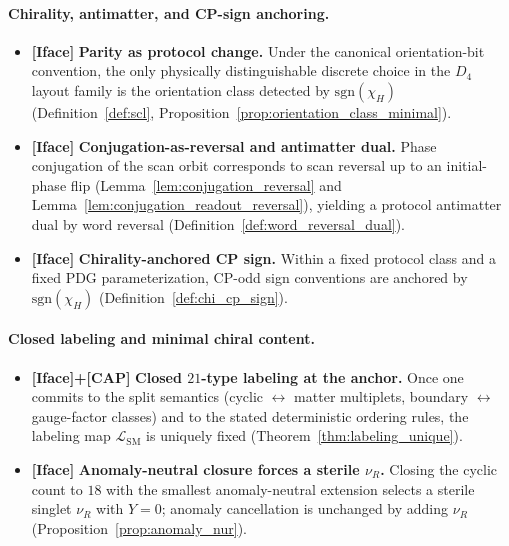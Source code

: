 \paragraph{Chirality, antimatter, and CP-sign anchoring.}
\begin{itemize}
\item \textbf{[Iface]} \textbf{Parity as protocol change.}
Under the canonical orientation-bit convention, the only physically distinguishable discrete choice in the $D_4$ layout family is the orientation class detected by $\mathrm{sgn}(\chi_H)$ (Definition~\ref{def:scl}, Proposition~\ref{prop:orientation_class_minimal}).
\item \textbf{[Iface]} \textbf{Conjugation-as-reversal and antimatter dual.}
Phase conjugation of the scan orbit corresponds to scan reversal up to an initial-phase flip (Lemma~\ref{lem:conjugation_reversal} and Lemma~\ref{lem:conjugation_readout_reversal}), yielding a protocol antimatter dual by word reversal (Definition~\ref{def:word_reversal_dual}).
\item \textbf{[Iface]} \textbf{Chirality-anchored CP sign.}
Within a fixed protocol class and a fixed PDG parameterization, CP-odd sign conventions are anchored by $\mathrm{sgn}(\chi_H)$ (Definition~\ref{def:chi_cp_sign}).
\end{itemize}

\paragraph{Closed labeling and minimal chiral content.}
\begin{itemize}
\item \textbf{[Iface]+[CAP]} \textbf{Closed $21$-type labeling at the anchor.}
Once one commits to the split semantics (cyclic $\leftrightarrow$ matter multiplets, boundary $\leftrightarrow$ gauge-factor classes) and to the stated deterministic ordering rules, the labeling map $\mathcal{L}_{\mathrm{SM}}$ is uniquely fixed (Theorem~\ref{thm:labeling_unique}).
\item \textbf{[Iface]} \textbf{Anomaly-neutral closure forces a sterile $\nu_R$.}
Closing the cyclic count to $18$ with the smallest anomaly-neutral extension selects a sterile singlet $\nu_R$ with $Y=0$; anomaly cancellation is unchanged by adding $\nu_R$ (Proposition~\ref{prop:anomaly_nur}).
\end{itemize}

